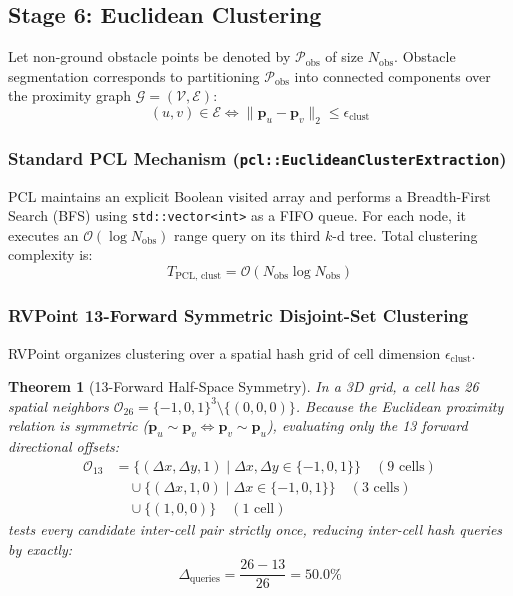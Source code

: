 \documentclass[journal,compsoc]{IEEEtran}
\newtheorem{theorem}{Theorem}
\begin{document}
\subsection{Stage 6: Euclidean Clustering}
\label{sec:clustering}

Let non-ground obstacle points be denoted by $\mathcal{P}_{\text{obs}}$ of size $N_{\text{obs}}$. Obstacle segmentation corresponds to partitioning $\mathcal{P}_{\text{obs}}$ into connected components over the proximity graph $\mathcal{G} = (\mathcal{V}, \mathcal{E})$:
\begin{equation}
(u, v) \in \mathcal{E} \iff \|\bm{p}_u - \bm{p}_v\|_2 \le \epsilon_{\text{clust}}
\end{equation}

\subsubsection{Standard PCL Mechanism (\texttt{pcl::EuclideanClusterExtraction})}
PCL maintains an explicit Boolean visited array and performs a Breadth-First Search (BFS) using \texttt{std::vector<int>} as a FIFO queue. For each node, it executes an $\mathcal{O}(\log N_{\text{obs}})$ range query on its third $k$-d tree. Total clustering complexity is:
\begin{equation}
T_{\text{PCL, clust}} = \mathcal{O}(N_{\text{obs}} \log N_{\text{obs}})
\end{equation}

\subsubsection{RVPoint 13-Forward Symmetric Disjoint-Set Clustering}
RVPoint organizes clustering over a spatial hash grid of cell dimension $\epsilon_{\text{clust}}$.

\begin{theorem}[13-Forward Half-Space Symmetry]
In a 3D grid, a cell has 26 spatial neighbors $\mathcal{O}_{26} = \{-1, 0, 1\}^3 \setminus \{(0,0,0)\}$. Because the Euclidean proximity relation is symmetric ($\bm{p}_u \sim \bm{p}_v \iff \bm{p}_v \sim \bm{p}_u$), evaluating only the 13 forward directional offsets:
\begin{align}
\mathcal{O}_{13} &= \{ (\Delta x, \Delta y, 1) \mid \Delta x, \Delta y \in \{-1, 0, 1\} \} \quad (\text{9 cells}) \nonumber \\
&\quad \cup \{ (\Delta x, 1, 0) \mid \Delta x \in \{-1, 0, 1\} \} \quad (\text{3 cells}) \nonumber \\
&\quad \cup \{ (1, 0, 0) \} \quad (\text{1 cell})
\label{eq:13_forward}
\end{align}
tests every candidate inter-cell pair strictly once, reducing inter-cell hash queries by exactly:
\begin{equation}
\Delta_{\text{queries}} = \frac{26 - 13}{26} = 50.0\%
\end{equation}
\end{theorem}
\end{document}
